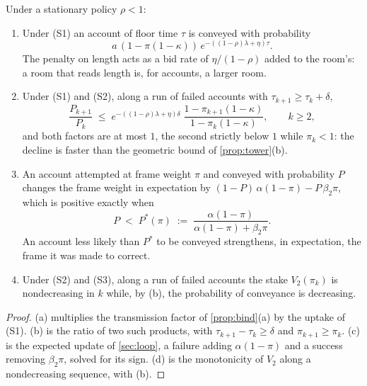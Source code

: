 \begin{proposition}\label{prop:sealing}
Under a stationary policy $\rho < 1$:
\begin{enumerate}[label=(\alph*)]
\item Under (S1) an account of floor time $\tau$ is conveyed with probability
\[
a\,(1 - \pi(1-\kappa))\,e^{-((1-\rho)\lambda + \eta)\tau} .
\]
The penalty on length acts as a bid rate of $\eta/(1-\rho)$ added to the room's: a room that reads length is, for accounts, a larger room.
\item Under (S1) and (S2), along a run of failed accounts with $\tau_{k+1} \ge \tau_k + \delta$,
\[
\frac{P_{k+1}}{P_k} \;\le\; e^{-((1-\rho)\lambda + \eta)\delta}\;\frac{1 - \pi_{k+1}(1-\kappa)}{1 - \pi_k(1-\kappa)}, \qquad k \ge 2,
\]
and both factors are at most $1$, the second strictly below $1$ while $\pi_k < 1$: the decline is faster than the geometric bound of \autoref{prop:tower}(b).
\item An account attempted at frame weight $\pi$ and conveyed with probability $P$ changes the frame weight in expectation by $(1-P)\,\alpha(1-\pi) - P\,\beta_2\pi$, which is positive exactly when
\[
P \;<\; P^{\ast}(\pi) \;:=\; \frac{\alpha(1-\pi)}{\alpha(1-\pi) + \beta_2\pi} .
\]
An account less likely than $P^{\ast}$ to be conveyed strengthens, in expectation, the frame it was made to correct.
\item Under (S2) and (S3), along a run of failed accounts the stake $V_2(\pi_k)$ is nondecreasing in $k$ while, by (b), the probability of conveyance is decreasing.
\end{enumerate}
\end{proposition}

\begin{proof}
(a) multiplies the transmission factor of \autoref{prop:bind}(a) by the uptake of (S1). (b) is the ratio of two such products, with $\tau_{k+1} - \tau_k \ge \delta$ and $\pi_{k+1} \ge \pi_k$. (c) is the expected update of \autoref{sec:loop}, a failure adding $\alpha(1-\pi)$ and a success removing $\beta_2\pi$, solved for its sign. (d) is the monotonicity of $V_2$ along a nondecreasing sequence, with (b).
\end{proof}

